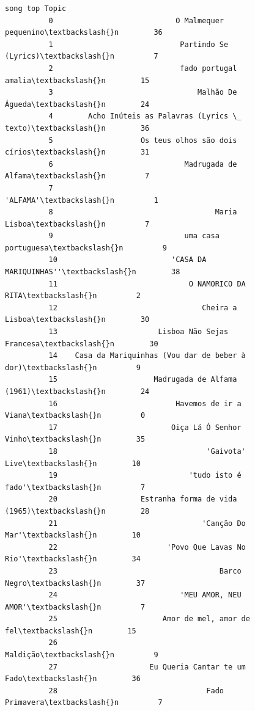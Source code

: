 \documentclass[11pt]{article}
\begin{document}
\begin{Verbatim}[commandchars=\\\{\}]
                                                          song top Topic  
          0                            O Malmequer pequenino\textbackslash{}n        36  
          1                             Partindo Se (Lyrics)\textbackslash{}n         7  
          2                             fado portugal amalia\textbackslash{}n        15  
          3                                 Malhão De Águeda\textbackslash{}n        24  
          4        Acho Inúteis as Palavras (Lyrics \_ texto)\textbackslash{}n        36  
          5                    Os teus olhos são dois círios\textbackslash{}n        31  
          6                              Madrugada de Alfama\textbackslash{}n         7  
          7                                         'ALFAMA'\textbackslash{}n         1  
          8                                     Maria Lisboa\textbackslash{}n         7  
          9                              uma casa portuguesa\textbackslash{}n         9  
          10                          'CASA DA MARIQUINHAS''\textbackslash{}n        38  
          11                              O NAMORICO DA RITA\textbackslash{}n         2  
          12                                 Cheira a Lisboa\textbackslash{}n        30  
          13                       Lisboa Não Sejas Francesa\textbackslash{}n        30  
          14    Casa da Mariquinhas (Vou dar de beber à dor)\textbackslash{}n         9  
          15                      Madrugada de Alfama (1961)\textbackslash{}n        24  
          16                           Havemos de ir a Viana\textbackslash{}n         0  
          17                          Oiça Lá Ó Senhor Vinho\textbackslash{}n        35  
          18                                  'Gaivota' Live\textbackslash{}n        10  
          19                              'tudo isto é fado'\textbackslash{}n         7  
          20                   Estranha forma de vida (1965)\textbackslash{}n        28  
          21                                 'Canção Do Mar'\textbackslash{}n        10  
          22                         'Povo Que Lavas No Rio'\textbackslash{}n        34  
          23                                     Barco Negro\textbackslash{}n        37  
          24                            'MEU AMOR, NEU AMOR'\textbackslash{}n         7  
          25                        Amor de mel, amor de fel\textbackslash{}n        15  
          26                                        Maldição\textbackslash{}n         9  
          27                     Eu Queria Cantar te um Fado\textbackslash{}n        36  
          28                                  Fado Primavera\textbackslash{}n         7  

\end{Verbatim}
\end{document}
